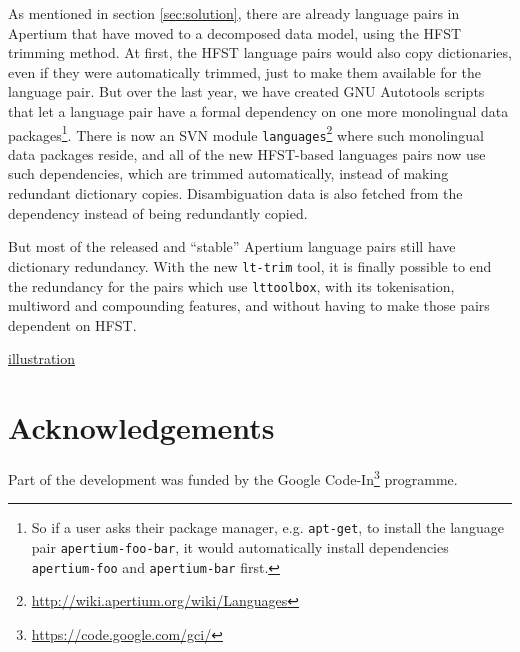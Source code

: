 \documentclass[10pt, a4paper]{article}
\newcommand{\tool}[1]{\texttt{#1}}
\begin{document}
As mentioned in section \ref{sec:solution}, there are already language
pairs in Apertium that have moved to a decomposed data model, using
the HFST trimming method. At first, the HFST language pairs would also
copy dictionaries, even if they were automatically trimmed, just to
make them available for the language pair.  But over the last year, we
have created GNU Autotools scripts that let a language pair have a
formal dependency on one more monolingual data packages\footnote{So if
    a user asks their package manager, e.g. \tool{apt-get}, to install
    the language pair \tool{apertium-foo-bar}, it would automatically
    install dependencies \tool{apertium-foo} and \tool{apertium-bar}
first.}. There is now an SVN module
\texttt{languages}\footnote{\href{http://wiki.apertium.org/wiki/Languages}{http://wiki.apertium.org/wiki/Languages}}
where such monolingual data packages reside, and all of the new
HFST-based languages pairs now use such dependencies, which are
trimmed automatically, instead of making redundant dictionary copies.
Disambiguation data is also fetched from the dependency instead of
being redundantly copied.

But most of the released and ``stable'' Apertium language pairs still
have dictionary redundancy.  With the new \tool{lt-trim} tool, it is
finally possible to end the redundancy for the pairs which use
\tool{lttoolbox}, with its tokenisation, multiword and compounding
features, and without having to make those pairs dependent on HFST.


\href{http://awwapp.com/draw.html#62731a1e}{illustration}

\section*{Acknowledgements}
Part of the development was funded by the Google
Code-In\footnote{\href{https://code.google.com/gci/}{https://code.google.com/gci/}} programme.



\end{document}
